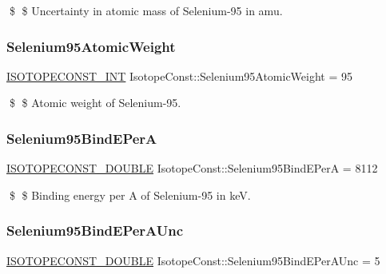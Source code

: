 \$ \$ Uncertainty in atomic mass of Selenium-\/95 in amu. \mbox{\label{group___isotope_const-_selenium-_se95_gaa0812d397aeda6ef03a2e8c65eff6599}} 
\subsubsection{\texorpdfstring{Selenium95\+Atomic\+Weight}{Selenium95AtomicWeight}}
{\footnotesize\ttfamily \mbox{\hyperlink{group___isotope_const-_macros_ga5f18360b3e99483a35c32d789e62621c}{I\+S\+O\+T\+O\+P\+E\+C\+O\+N\+S\+T\+\_\+\+I\+NT}} Isotope\+Const\+::\+Selenium95\+Atomic\+Weight = 95}

\$ \$ Atomic weight of Selenium-\/95. \mbox{\label{group___isotope_const-_selenium-_se95_gafc079726c23b6243700a417d95c14548}} 
\subsubsection{\texorpdfstring{Selenium95\+Bind\+E\+PerA}{Selenium95BindEPerA}}
{\footnotesize\ttfamily \mbox{\hyperlink{group___isotope_const-_macros_ga8f45a7272ce02c0b4c65c44636ed719a}{I\+S\+O\+T\+O\+P\+E\+C\+O\+N\+S\+T\+\_\+\+D\+O\+U\+B\+LE}} Isotope\+Const\+::\+Selenium95\+Bind\+E\+PerA = 8112}

\$ \$ Binding energy per A of Selenium-\/95 in keV. \mbox{\label{group___isotope_const-_selenium-_se95_ga583e4c4d2025792814810439259ca5c8}} 
\subsubsection{\texorpdfstring{Selenium95\+Bind\+E\+Per\+A\+Unc}{Selenium95BindEPerAUnc}}
{\footnotesize\ttfamily \mbox{\hyperlink{group___isotope_const-_macros_ga8f45a7272ce02c0b4c65c44636ed719a}{I\+S\+O\+T\+O\+P\+E\+C\+O\+N\+S\+T\+\_\+\+D\+O\+U\+B\+LE}} Isotope\+Const\+::\+Selenium95\+Bind\+E\+Per\+A\+Unc = 5}

